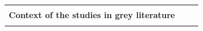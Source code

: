 \documentclass[english, 12pt, a4paper, sci, utf8, a-1b, online]{aaltothesis}
\begin{document}
\begin{center}
\begin{longtable}{p{0.3\linewidth}p{0.6\linewidth}}
                                      &                                                                                                                                                                                                                                                                                                                                                                                                                                                                                                                                                                                                                                                                                                                                                                                                                                                 \\
    \multicolumn{2}{l}{\textbf{Context of the studies in grey literature}}                                                                                                                                                                                                                                                                                                                                                                                                                                                                                                                                                                                                                                                                                                                                                                                                                                                 \\
    \hline                                                                                                                                                                                                                                                                                                                                                                                                                                                                                                                                                                                                                                                                                                                                                                                                                                                                              \\

\end{longtable}
\end{center}
\end{document}
